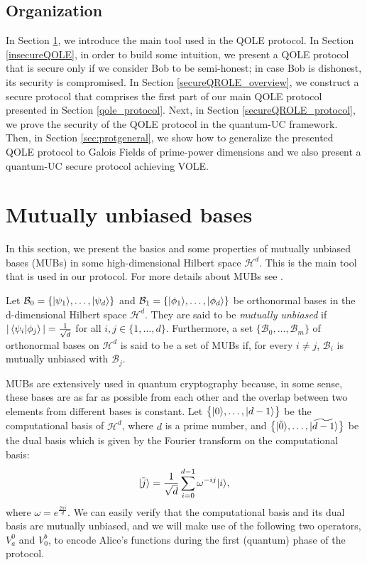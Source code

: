 \subsection{Organization}\label{Intro_organization}
In Section \ref{Prelim_MUB}, we introduce the main tool used in the QOLE protocol. In Section \ref{insecureQOLE}, in order to build some intuition, we present a QOLE protocol that is secure only if we consider Bob to be semi-honest; in case Bob is dishonest, its security is compromised. In Section \ref{secureQROLE_overview}, we construct a secure protocol that comprises the first part of our main QOLE protocol presented in Section \ref{qole_protocol}. Next, in Section \ref{secureQROLE_protocol}, we prove the security of the QOLE protocol in the quantum-UC framework. Then, in Section \ref{sec:protgeneral}, we show how to generalize the presented QOLE protocol to  Galois Fields of prime-power dimensions and we also present a quantum-UC secure protocol achieving VOLE.


\section{Mutually unbiased bases}\label{Prelim_MUB}

In this section, we present the basics and some properties of mutually unbiased bases (MUBs) in some high-dimensional Hilbert space $\mathcal{H}^d$. This is the main tool that is used in our protocol. For more details about MUBs see \cite{DEBZ10}.

\begin{definition}
Let $\mathcal{B}_0 = \{| \psi_1 \rangle, \ldots, | \psi_d \rangle\}$ and $\mathcal{B}_1 = \{| \phi_1 \rangle, \ldots, | \phi_d \rangle\}$ be orthonormal bases in the d-dimensional Hilbert space $\mathcal{H}^d$. They are said to be \textit{mutually unbiased} if $| \braket{\psi_i}{\phi_j} | = \frac{1}{\sqrt{d}}$ for all $i, j\in \{1,\ldots,d\}$. Furthermore, a set $\{\mathcal{B}_0, \ldots, \mathcal{B}_m\}$ of orthonormal bases on $\mathcal{H}^d$ is said to be a set of MUBs if, for every $i\neq j$, $\mathcal{B}_i$ is mutually unbiased with $\mathcal{B}_j$.
\end{definition}

MUBs are extensively used in quantum cryptography because, in some sense, these bases are as far as possible from each other and the overlap between two elements from different bases is constant. Let $\big\{| 0 \rangle, \ldots, | d-1 \rangle\big\}$ be the computational basis of $\mathcal{H}^d$, where $d$ is a prime number, and $\big\{| \tilde{0} \rangle, \ldots, | \widetilde{d-1} \rangle\big\}$ be the dual basis which is given by the Fourier transform on the computational basis:
\begin{equation*}
    | \tilde{j} \rangle = \frac{1}{\sqrt{d}} \sum_{i=0}^{d-1} \omega^{-i j} | i \rangle,\label{eq:dualbasis}
\end{equation*}
where $\omega = e^{\frac{2\pi i}{d}}$. We can easily verify that the computational basis and its dual basis are mutually unbiased, and we will make use of the following two operators, $V^0_a$ and $V^b_0$, to encode Alice's functions during the first (quantum) phase of the protocol.

